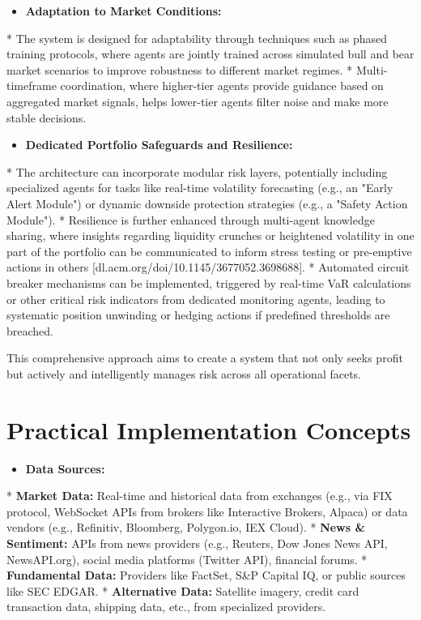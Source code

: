 \documentclass[11pt]{article}
\begin{document}
\begin{itemize}
\item   \textbf{Adaptation to Market Conditions:}
\end{itemize}
    *   The system is designed for adaptability through techniques such as phased training protocols, where agents are jointly trained across simulated bull and bear market scenarios to improve robustness to different market regimes.
    *   Multi-timeframe coordination, where higher-tier agents provide guidance based on aggregated market signals, helps lower-tier agents filter noise and make more stable decisions.

\begin{itemize}
\item   \textbf{Dedicated Portfolio Safeguards and Resilience:}
\end{itemize}
    *   The architecture can incorporate modular risk layers, potentially including specialized agents for tasks like real-time volatility forecasting (e.g., an "Early Alert Module") or dynamic downside protection strategies (e.g., a "Safety Action Module").
    *   Resilience is further enhanced through multi-agent knowledge sharing, where insights regarding liquidity crunches or heightened volatility in one part of the portfolio can be communicated to inform stress testing or pre-emptive actions in others [dl.acm.org/doi/10.1145/3677052.3698688].
    *   Automated circuit breaker mechanisms can be implemented, triggered by real-time VaR calculations or other critical risk indicators from dedicated monitoring agents, leading to systematic position unwinding or hedging actions if predefined thresholds are breached.

This comprehensive approach aims to create a system that not only seeks profit but actively and intelligently manages risk across all operational facets.

\section{Practical Implementation Concepts}

\begin{itemize}
\item   \textbf{Data Sources:}
\end{itemize}
    *   \textbf{Market Data:} Real-time and historical data from exchanges (e.g., via FIX protocol, WebSocket APIs from brokers like Interactive Brokers, Alpaca) or data vendors (e.g., Refinitiv, Bloomberg, Polygon.io, IEX Cloud).
    *   \textbf{News \& Sentiment:} APIs from news providers (e.g., Reuters, Dow Jones News API, NewsAPI.org), social media platforms (Twitter API), financial forums.
    *   \textbf{Fundamental Data:} Providers like FactSet, S\&P Capital IQ, or public sources like SEC EDGAR.
    *   \textbf{Alternative Data:} Satellite imagery, credit card transaction data, shipping data, etc., from specialized providers.
\end{document}

